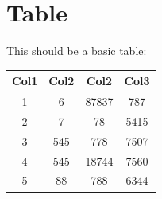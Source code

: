 \documentclass[11pt, a4paper]{article}
\begin{document}
    \section{Table}\label{sec:table}
    This should be a basic table:
    \begin{table}[h]
        \centering
        \begin{tabular}{| c | c | c | c|}
            \hline
            Col1 & Col2 & Col2  & Col3 \\
            \hline
            1    & 6    & 87837 & 787  \\
            \hline
            2    & 7    & 78    & 5415 \\
            \hline
            3    & 545  & 778   & 7507 \\
            \hline
            4    & 545  & 18744 & 7560 \\
            \hline
            5    & 88   & 788   & 6344 \\
            \hline
        \end{tabular}
        \label{tab:table}
    \end{table}
\end{document}
